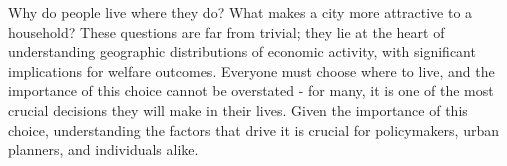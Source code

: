 \documentclass[10pt]{article}
\begin{document}




Why do people live where they do? What makes a city more attractive to a household? These questions are far from trivial; they lie at the heart of understanding geographic distributions of economic activity, with significant implications for welfare outcomes. Everyone must choose where to live, and the importance of this choice cannot be overstated - for many, it is one of the most crucial decisions they will make in their lives. Given the importance of this choice, understanding the factors that drive it is crucial for policymakers, urban planners, and individuals alike.
\end{document}
